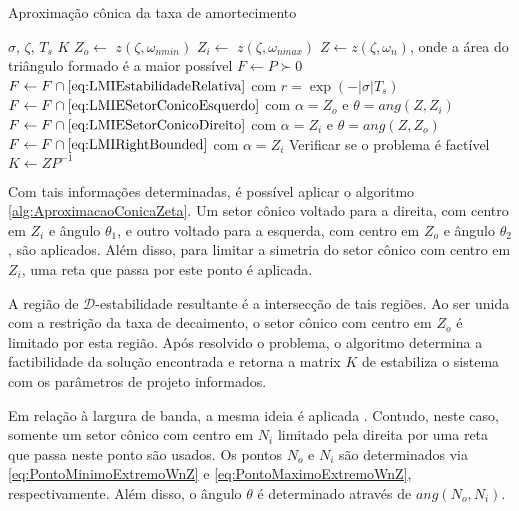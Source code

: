 \begin{algorithm}[ht!]
  \caption{Aproximação cônica da taxa de amortecimento}\label{alg:AproximacaoConicaZeta}
  \begin{algorithmic}[1]
    \Require $\sigma$, $\zeta$, $T_s$
    \Ensure $K$
    \State $Z_o \gets $ $z(\zeta,\omega_{nmin})$
    \State $Z_i \gets $ $z\left(\zeta,\omega_{nmax}\right)$
    \State $Z \gets z(\zeta,\omega_n)$, onde a área do triângulo formado é a maior possível
    \State $F \gets P \succ 0$
    \State $F \gets F \cap \eqref{eq:LMIEstabilidadeRelativa}$ com $r = \exp{\left(-|\sigma|T_s\right)}$ 
    \State $F \gets F \cap \eqref{eq:LMIESetorConicoEsquerdo}$ com $\alpha = Z_o$ e $\theta = ang(Z,Z_i)$ 
    \State $F \gets F \cap \eqref{eq:LMIESetorConicoDireito}$ com $\alpha = Z_i$ e $\theta = ang(Z,Z_o)$ 
    \State $F \gets F \cap \eqref{eq:LMIRightBounded}$ com $\alpha = Z_i$  
    \State Verificar se o problema é factível
    \State $K \gets ZP^{-1}$
  \end{algorithmic}
\end{algorithm}

Com tais informações determinadas, é possível aplicar o algoritmo \ref{alg:AproximacaoConicaZeta}. Um setor cônico voltado para a direita, com centro em $Z_i$ e ângulo $\theta_1$, e outro voltado para a esquerda, com centro em $Z_o$ e ângulo $\theta_2$, são aplicados. Além disso, para limitar a simetria do setor cônico com centro em $Z_i$, uma reta que passa por este ponto é aplicada.

A região de $\mathscr{D}$-estabilidade resultante é a intersecção de tais regiões. Ao ser unida com a restrição da taxa de decaimento, o setor cônico com centro em $Z_o$ é limitado por esta região. Após resolvido o problema, o algoritmo determina a factibilidade da solução encontrada e retorna a matrix $K$ de estabiliza o sistema com os parâmetros de projeto informados.

Em relação à largura de banda, a mesma ideia é aplicada \cite{CHIQUETO2021}. Contudo, neste caso, somente um setor cônico com centro em $N_i$ limitado pela direita por uma reta que passa neste ponto são usados. Os pontos $N_o$ e $N_i$ são determinados via \eqref{eq:PontoMinimoExtremoWnZ} e \eqref{eq:PontoMaximoExtremoWnZ}, respectivamente. Além disso, o ângulo $\theta$ é determinado através de $ang(N_o,N_i)$.  

